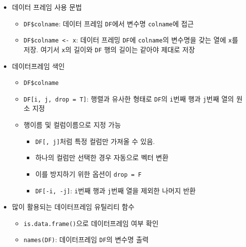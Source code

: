 \documentclass[11pt,a4paper]{book}
\providecommand{\tightlist}{%
  \setlength{\itemsep}{0pt}\setlength{\parskip}{0pt}}
\theoremstyle{definition}
\theoremstyle{definition}
\theoremstyle{definition}
\theoremstyle{remark}
\begin{document}
\begin{itemize}
\tightlist
\item
  데이터 프레임 사용 문법

  \begin{itemize}
  \tightlist
  \item
    \texttt{DF\$colname}: 데이터 프레임 \texttt{DF}에서 변수명
    \texttt{colname}에 접근
  \item
    \texttt{DF\$colname\ \textless{}-\ x}: 데이터 프레밍 \texttt{DF}에
    \texttt{colname}의 변수명을 갖는 열에 \texttt{x}를 저장. 여기서
    \texttt{x}의 길이와 \texttt{DF} 행의 길이는 같아야 제대로 저장
  \end{itemize}
\item
  데이터프레임 색인

  \begin{itemize}
  \tightlist
  \item
    \texttt{DF\$colname}
  \item
    \texttt{DF{[}i,\ j,\ drop\ =\ T{]}}: 행렬과 유사한 형태로
    \texttt{DF}의 \texttt{i}번째 행과 \texttt{j}번째 열의 원소 지정
  \item
    행이름 및 컬럼이름으로 지정 가능

    \begin{itemize}
    \tightlist
    \item
      \texttt{DF{[},\ j{]}}처럼 특정 컬럼만 가져올 수 있음.
    \item
      하나의 컬럼만 선택한 경우 자동으로 벡터 변환
    \item
      이를 방지하기 위한 옵션이 \texttt{drop\ =\ F}
    \item
      \texttt{DF{[}-i,\ -j{]}}: \texttt{i}번째 행과 \texttt{j}번째 열을
      제외한 나머지 반환
    \end{itemize}
  \end{itemize}
\item
  많이 활용되는 데이터프레임 유틸리티 함수

  \begin{itemize}
  \tightlist
  \item
    \texttt{is.data.frame()}으로 데이터프레임 여부 확인
  \item
    \texttt{names(DF)}: 데이터프레임 \texttt{DF}의 변수명 출력


\end{itemize}
\end{itemize}
\end{document}
